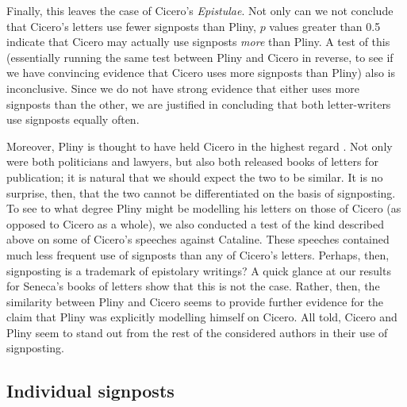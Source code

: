 Finally, this leaves the case of Cicero's \textit{Epistulae}. Not only can we not conclude that Cicero's letters use fewer signposts than Pliny, $p$ values greater than 0.5 indicate that Cicero may actually use signposts \textit{more} than Pliny. A test of this (essentially running the same test between Pliny and Cicero in reverse, to see if we have convincing evidence that Cicero uses more signposts than Pliny) also is inconclusive. Since we do not have strong evidence that either uses more signposts than the other, we are justified in concluding that both letter-writers use signposts equally often. 

Moreover, Pliny is thought to have held Cicero in the highest regard \cite{plinycicero1} \cite{plinycicero2}. Not only were both politicians and lawyers, but also both released books of letters for publication; it is natural that we should expect the two to be similar. It is no surprise, then, that the two cannot be differentiated on the basis of signposting. To see to what degree Pliny might be modelling his letters on those of Cicero (as opposed to Cicero as a whole), we also conducted a test of the kind described above on some of Cicero's speeches against Cataline. These speeches contained much less frequent use of signposts than any of Cicero's letters. Perhaps, then, signposting is a trademark of epistolary writings? A quick glance at our results for Seneca's books of letters show that this is not the case. Rather, then, the similarity between Pliny and Cicero seems to provide further evidence for the claim that Pliny was explicitly modelling himself on Cicero. All told, Cicero and Pliny seem to stand out from the rest of the considered authors in their use of signposting.

\subsection{Individual signposts}
\label{sec:plots}

